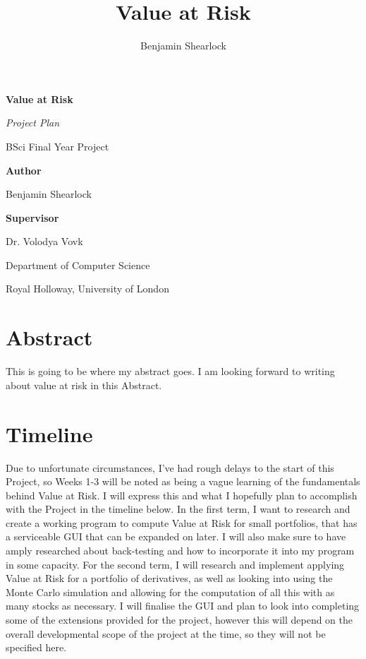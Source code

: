 \documentclass{article}
\title{Value at Risk}
\author{Benjamin Shearlock}
\begin{document}
\begin{titlepage}
  \begin{center}
    \vspace*{1cm}
    {\LARGE \textbf{Value at Risk} \par} 
    \vspace{1.5cm}
    {\Large \textit{Project Plan} \par} 
    \vspace{0.5cm}
    {\Large BSci Final Year Project \par}
    \vspace{2cm}
    {\large \textbf{Author} \par}
    {\large Benjamin Shearlock \par}
    \vspace{2cm}
    {\large \textbf{Supervisor} \par}
    {\large Dr. Volodya Vovk \par}
    \vfill
    {\large Department of Computer Science \par}
    {\large Royal Holloway, University of London \par}
  \end{center}
\end{titlepage}


\section{Abstract}
This is going to be where my abstract goes. I am looking forward to writing about value at risk in this Abstract.

\section{Timeline}
Due to unfortunate circumstances, I've had rough delays to the start of this Project, so Weeks 1-3 will be noted as being a vague learning of the fundamentals behind Value at Risk. I will express this and what I hopefully plan to accomplish with the Project in the timeline below. In the first term, I want to research and create a working program to compute Value at Risk for small portfolios, that has a serviceable GUI that can be expanded on later. I will also make sure to have amply researched about back-testing and how to incorporate it into my program in some capacity. For the second term, I will research and implement applying Value at Risk for a portfolio of derivatives, as well as looking into using the Monte Carlo simulation and allowing for the computation of all this with as many stocks as necessary. I will finalise the GUI and plan to look into completing some of the extensions provided for the project, however this will depend on the overall developmental scope of the project at the time, so they will not be specified here.
\end{document}
